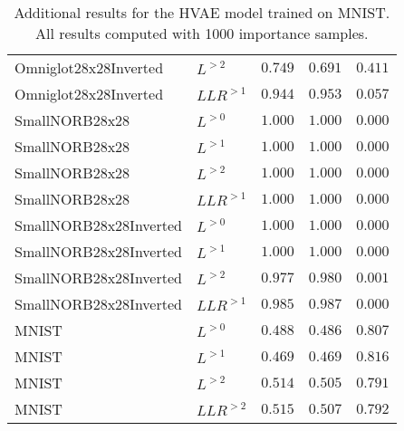 {\begin{table}[t]
\begin{tabular}{llrrr}
Omniglot28x28Inverted            &  $L^{>2}$  &  $0.749$  &  $0.691$  &  $0.411$ \\
Omniglot28x28Inverted          &  $LLR^{>1}$  &  $0.944$  &  $0.953$  &  $0.057$ \\
\midrule
SmallNORB28x28                   &  $L^{>0}$  &  $1.000$  &  $1.000$  &  $0.000$ \\
SmallNORB28x28                   &  $L^{>1}$  &  $1.000$  &  $1.000$  &  $0.000$ \\
SmallNORB28x28                   &  $L^{>2}$  &  $1.000$  &  $1.000$  &  $0.000$ \\
SmallNORB28x28                 &  $LLR^{>1}$  &  $1.000$  &  $1.000$  &  $0.000$ \\
\midrule
SmallNORB28x28Inverted           &  $L^{>0}$  &  $1.000$  &  $1.000$  &  $0.000$ \\
SmallNORB28x28Inverted           &  $L^{>1}$  &  $1.000$  &  $1.000$  &  $0.000$ \\
SmallNORB28x28Inverted           &  $L^{>2}$  &  $0.977$  &  $0.980$  &  $0.001$ \\
SmallNORB28x28Inverted         &  $LLR^{>1}$  &  $0.985$  &  $0.987$  &  $0.000$ \\
\midrule
MNIST                            &  $L^{>0}$  &  $0.488$  &  $0.486$  &  $0.807$ \\
MNIST                            &  $L^{>1}$  &  $0.469$  &  $0.469$  &  $0.816$ \\
MNIST                            &  $L^{>2}$  &  $0.514$  &  $0.505$  &  $0.791$ \\
MNIST                          &  $LLR^{>2}$  &  $0.515$  &  $0.507$  &  $0.792$ \\
         \bottomrule
    \end{tabular}
    \caption[Additional results for the HVAE model trained on MNIST]{Additional results for the HVAE model trained on MNIST. All results computed with 1000 importance samples.}
    \label{tab_hierarchical:additional-results-mnist}
\end{table}
\fi
}